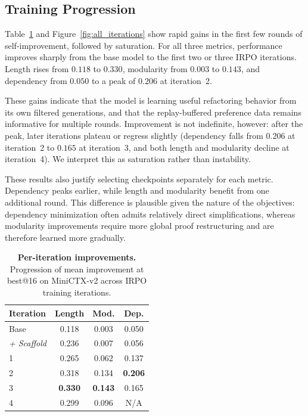 \subsection{Training Progression}
\label{sec:imp2_training}

Table~\ref{tab:imp2_iter} and Figure~\ref{fig:all_iterations} show rapid gains in the first few rounds of self-improvement, followed by saturation. For all three metrics, performance improves sharply from the base model to the first two or three IRPO iterations. Length rises from $0.118$ to $0.330$, modularity from $0.003$ to $0.143$, and dependency from $0.050$ to a peak of $0.206$ at iteration~2.

These gains indicate that the model is learning useful refactoring behavior from its own filtered generations, and that the replay-buffered preference data remains informative for multiple rounds. Improvement is not indefinite, however: after the peak, later iterations plateau or regress slightly (dependency falls from $0.206$ at iteration~2 to $0.165$ at iteration~3, and both length and modularity decline at iteration~4). We interpret this as saturation rather than instability.

These results also justify selecting checkpoints separately for each metric. Dependency peaks earlier, while length and modularity benefit from one additional round. This difference is plausible given the nature of the objectives: dependency minimization often admits relatively direct simplifications, whereas modularity improvements require more global proof restructuring and are therefore learned more gradually.

\begin{table}[ht]
\centering
\caption{\textbf{Per-iteration improvements.} Progression of mean improvement at best@16 on MiniCTX-v2 across IRPO training iterations.}
\label{tab:imp2_iter}
\small
\begin{tabular}{lccc}
\toprule
\textbf{Iteration} & \textbf{Length} & \textbf{Mod.} & \textbf{Dep.} \\
\midrule
Base             & 0.118 & 0.003 & 0.050 \\
\textit{+ Scaffold} & 0.236 & 0.007 & 0.056 \\
\midrule
1                & 0.265 & 0.062 & 0.137 \\
2                & 0.318 & 0.134 & \textbf{0.206} \\
3                & \textbf{0.330} & \textbf{0.143} & 0.165 \\
4                & 0.299 & 0.096 & N/A \\
\bottomrule
\end{tabular}
\end{table}

